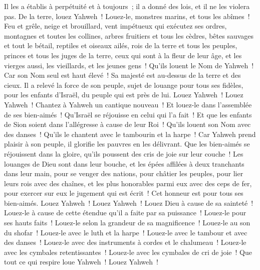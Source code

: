 \begin{multicols}{2}
Il les a établis à perpétuité et à toujours~; il a donné des lois, et il ne les violera pas.
De la terre, louez Yahweh~! Louez-le, monstres marins, et tous les abîmes~!
Feu et grêle, neige et brouillard, vent impétueux qui exécutez ses ordres,
montagnes et toutes les collines, arbres fruitiers et tous les cèdres,
bêtes sauvages et tout le bétail, reptiles et oiseaux ailés,
rois de la terre et tous les peuples, princes et tous les juges de la terre,
ceux qui sont à la fleur de leur âge, et les vierges aussi, les vieillards, et les jeunes gens~!
Qu'ils louent le Nom de Yahweh~! Car son Nom seul est haut élevé~! Sa majesté est au-dessus de la terre et des cieux.
Il a relevé la force de son peuple, sujet de louange pour tous ses fidèles, pour les enfants d'Israël, du peuple qui est près de lui. Louez Yahweh~!
\VerseOne{}Louez Yahweh~! Chantez à Yahweh un cantique nouveau~! Et louez-le dans l'assemblée de ses bien-aimés~!
Qu'Israël se réjouisse en celui qui l'a fait~! Et que les enfants de Sion soient dans l'allégresse à cause de leur Roi~!
Qu'ils louent son Nom avec des danses~! Qu'ils le chantent avec le tambourin et la harpe~!
Car Yahweh prend plaisir à son peuple, il glorifie les pauvres en les délivrant.
Que les bien-aimés se réjouissent dans la gloire, qu'ils poussent des cris de joie sur leur couche~!
Les louanges de Dieu sont dans leur bouche, et les épées affilées à deux tranchants dans leur main,
pour se venger des nations, pour châtier les peuples,
pour lier leurs rois avec des chaînes, et les plus honorables parmi eux avec des ceps de fer,
pour exercer sur eux le jugement qui est écrit~! Cet honneur est pour tous ses bien-aimés. Louez Yahweh~!
\VerseOne{}Louez Yahweh~! Louez Dieu à cause de sa sainteté~! Louez-le à cause de cette étendue qu'il a faite par sa puissance~!
Louez-le pour ses hauts faits~! Louez-le selon la grandeur de sa magnificence~!
Louez-le au son du shofar~! Louez-le avec le luth et la harpe~!
Louez-le avec le tambour et avec des danses~! Louez-le avec des instruments à cordes et le chalumeau~!
Louez-le avec les cymbales retentissantes~! Louez-le avec les cymbales de cri de joie~!
Que tout ce qui respire loue Yahweh~! Louez Yahweh~!
\PPE{}
\end{multicols}
